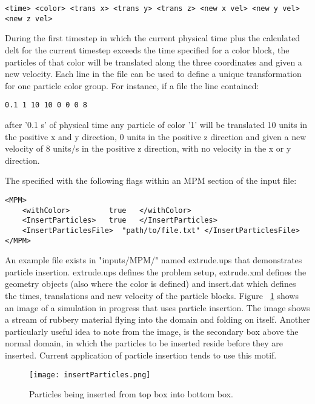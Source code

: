 \begin{verbatim}
<time> <color> <trans x> <trans y> <trans z> <new x vel> <new y vel> <new z vel>
\end{verbatim}  

During the first timestep in which the current physical time plus the calculated 
delt for the current timestep exceeds the time specified for a color block, the 
particles of that color will be translated along the three coordinates and given 
a new velocity.  Each line in the file can be used to define a unique transformation
for one particle color group.  For instance, if a file the line contained:

\begin{verbatim}
0.1 1 10 10 0 0 0 8 
\end{verbatim}

after '0.1 s' of physical time any particle of color '1' will be translated 10 
units in the positive x and y direction, 0 units in the positive z direction 
and given a new velocity of 8 units/s in the positive z direction, with no 
velocity in the x or y direction.

The specified with the following flags within an MPM section of the input file:
\begin{verbatim}
<MPM>
    <withColor>         true   </withColor>
    <InsertParticles>   true   </InsertParticles>
    <InsertParticlesFile>  "path/to/file.txt" </InsertParticlesFile>
</MPM>
\end{verbatim}

An example file exists in "inputs/MPM/" named extrude.ups that demonstrates 
particle insertion.  extrude.ups defines the problem setup, extrude.xml defines 
the geometry objects (also where the color is defined) and insert.dat which 
defines the times, translations and new velocity of the particle blocks.  
Figure ~\ref{figinsertparticles} shows an image of a simulation in progress that uses particle insertion.  
The image shows a stream of rubbery material flying into the domain and 
folding on itself.  Another particularly useful idea to note from the image, 
is the secondary box above the normal domain, in which the particles to be inserted 
reside before they are inserted.  Current application of particle insertion tends to use this motif.

\begin{figure}
  \center
  \texttt{[image: insertParticles.png]}
  \caption{Particles being inserted from top box into bottom box.}
  \label{figinsertparticles}
\end{figure}


